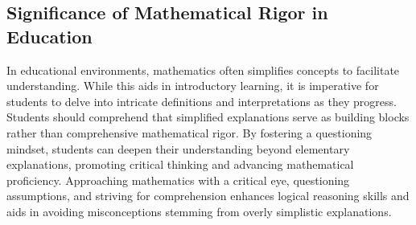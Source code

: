 \documentclass{article}
\begin{document}
\subsection{Significance of Mathematical Rigor in Education}
In educational environments, mathematics often simplifies concepts to facilitate understanding. While this aids in introductory learning, it is imperative for students to delve into intricate definitions and interpretations as they progress. Students should comprehend that simplified explanations serve as building blocks rather than comprehensive mathematical rigor. By fostering a questioning mindset, students can deepen their understanding beyond elementary explanations, promoting critical thinking and advancing mathematical proficiency. Approaching mathematics with a critical eye, questioning assumptions, and striving for comprehension enhances logical reasoning skills and aids in avoiding misconceptions stemming from overly simplistic explanations.

%
%
%
%
\end{document}
